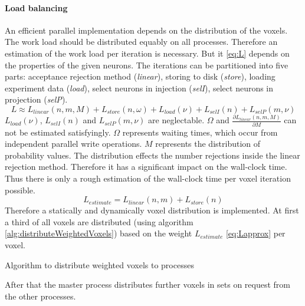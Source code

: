 \paragraph{Load balancing}
\label{par:loadbalancing}
An efficient parallel implementation depends on the distribution of the voxels.
The work load should be distributed equably on all processes.
Therefore an estimation of the work load per iteration is necessary.
But it \ref{eq:L} depends on the properties of the given neurons.
The iterations can be partitioned into five parts: acceptance rejection method (\emph{linear}), storing to disk (\emph{store}),
loading experiment data (\emph{load}), select neurons in injection (\emph{selI}), select neurons in projection (\emph{selP}).
\begin{equation} \label{eq:L}
	L \approx L_{linear}(n,m,M) + L_{store}(n,\omega) + L_{load}(\nu) + L_{selI}(n) + L_{selP}(m,\nu)
\end{equation}
$L_{load}(\nu)$, $L_{selI}(n)$ and $L_{selP}(m,\nu)$ are neglectable.
$\Omega$ and $\frac{\partial L_{linear}(n,m,M)}{\partial M}$  can not be estimated satisfyingly.
$\Omega$ represents waiting times, which occur from independent parallel write operations.
$M$ represents the distribution of probability values.
The distribution effects the number rejections inside the linear rejection method.
Therefore it has a significant impact on the wall-clock time.
Thus there is only a rough estimation of the wall-clock time per voxel iteration possible.
\begin{equation} \label{eq:Lapprox}
	L_{estimate} = L_{linear}(n,m) + L_{store}(n)
\end{equation}
Therefore a statically and dynamically voxel distribution is implemented.
At first a third of all voxels are distributed (using algorithm \ref{alg:distributeWeightedVoxels}) based on the weight $L_{estimate}$ \ref{eq:Lapprox}  per voxel.
\begin{algorithm}[ht!]
\caption{Algorithm to distribute weighted voxels to processes}
\label{alg:distributeWeightedVoxels}
\end{algorithm}
After that the master process distributes further voxels in sets on request from the other processes.

